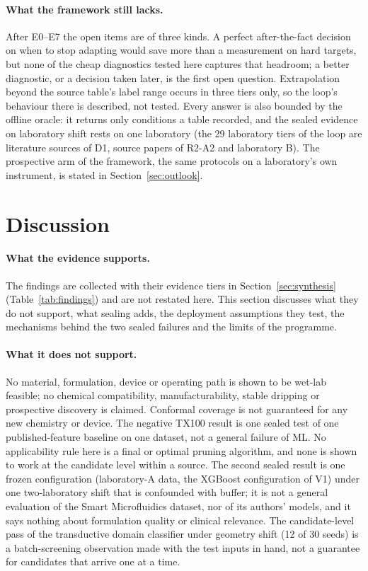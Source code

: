 \documentclass[11pt,a4paper]{article}
\newcommand{\tox}{TX100}
\begin{document}
\paragraph{What the framework still lacks.} After E0--E7 the open items are of three kinds.
A perfect after-the-fact decision on when to stop adapting would save more than a measurement on
hard targets, but none of the cheap diagnostics tested here captures that headroom;
a better diagnostic, or a decision taken later, is the first open question. Extrapolation beyond the
source table's label range occurs in three tiers only, so the loop's behaviour there is described, not
tested. Every answer is also bounded by the offline oracle: it returns only conditions a table
recorded, and the sealed evidence on laboratory shift rests on one laboratory (the 29 laboratory
tiers of the loop are literature sources of D1, source papers of R2-A2 and laboratory B). The prospective arm of the
framework, the same protocols on a laboratory's own instrument, is stated in
Section~\ref{sec:outlook}.

\section{Discussion}
\label{sec:discussion}

\paragraph{What the evidence supports.} The findings are collected with their
evidence tiers in Section~\ref{sec:synthesis} (Table~\ref{tab:findings}) and are
not restated here. This section discusses what they do not support, what
sealing adds, the deployment assumptions they test, the mechanisms behind the
two sealed failures and the limits of the programme.

\paragraph{What it does not support.} No material, formulation, device or
operating path is shown to be wet-lab feasible; no chemical compatibility,
manufacturability, stable dripping or prospective discovery is claimed.
Conformal coverage is not guaranteed for any new chemistry or device. The
negative \tox{} result is one sealed test of one published-feature baseline
on one dataset, not a general failure of ML. No applicability rule here is a
final or optimal pruning algorithm, and none is shown to work at the candidate
level within a source. The second sealed result is one frozen configuration
(laboratory-A data, the XGBoost configuration of V1) under one two-laboratory
shift that is confounded with buffer; it is not a general evaluation of the Smart Microfluidics
dataset, nor of its authors' models, and it says nothing about formulation
quality or clinical relevance. The candidate-level pass of the transductive
domain classifier under geometry shift (12 of 30 seeds) is a batch-screening
observation made with the test inputs in hand, not a guarantee for
candidates that arrive one at a time.
\end{document}
